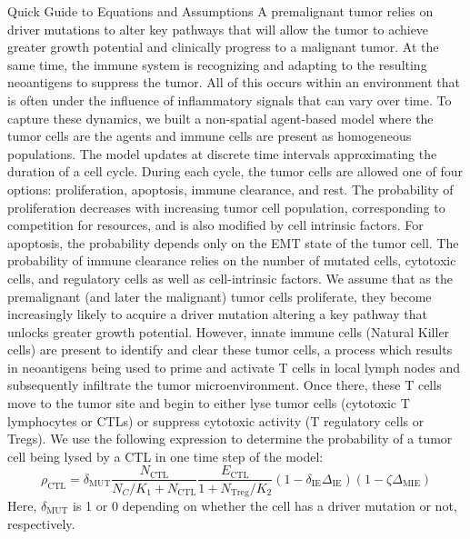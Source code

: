 \documentclass[11pt]{article}
\begin{document}
\begin{framed}
    Quick Guide to Equations and Assumptions
\newline
    A premalignant tumor relies on driver mutations to alter key pathways that will allow the tumor to achieve greater growth potential and clinically progress to a malignant tumor.
    At the same time, the immune system is recognizing and adapting to the resulting neoantigens to suppress the tumor.
    All of this occurs within an environment that is often under the influence of inflammatory signals that can vary over time.
\newline
    To capture these dynamics, we built a non-spatial agent-based model where the tumor cells are the agents and immune cells are present as homogeneous populations.
    The model updates at discrete time intervals approximating the duration of a cell cycle.
    During each cycle, the tumor cells are allowed one of four options: proliferation, apoptosis, immune clearance, and rest.
    The probability of proliferation decreases with increasing tumor cell population, corresponding to competition for resources, and is also modified by cell intrinsic factors.
    For apoptosis, the probability depends only on the EMT state of the tumor cell.
    The probability of immune clearance relies on the number of mutated cells, cytotoxic cells, and regulatory cells as well as cell-intrinsic factors.
    \newline
    We assume that as the premalignant (and later the malignant) tumor cells proliferate, they become increasingly likely to acquire a driver mutation altering a key pathway that unlocks greater growth potential.
    However, innate immune cells (Natural Killer cells) are present to identify and clear these tumor cells, a process which results in neoantigens being used to prime and activate T cells in local lymph nodes and subsequently infiltrate the tumor microenvironment.
    Once there, these T cells move to the tumor site and begin to either lyse tumor cells (cytotoxic T lymphocytes or CTLs) or suppress cytotoxic activity (T regulatory cells or Tregs).
    We use the following expression to determine the probability of a tumor cell being lysed by a CTL in one time step of the model:
    $$\rho_{\text{CTL}} =\delta_{\text{MUT}} \frac{N_{\text{CTL}}}{N_C/K_{1}+N_{\text{CTL}}}  \frac{E_{\text{CTL}}}{1+N_{\text{Treg}}/K_2} (1-\delta_{\text{IE}}\Delta_{\text{IE}})(1-\zeta \Delta_{\text{MIE}})$$
    Here, $\delta_\text{MUT}$ is 1 or 0 depending on whether the cell has a driver mutation or not, respectively.

\end{framed}
\end{document}
